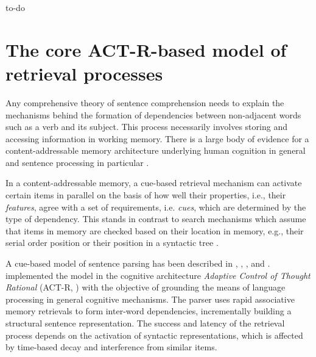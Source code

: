 \documentclass{cambridge7A}\usepackage[]{graphicx}\usepackage[]{color}
\begin{document}
to-do


\chapter{The core ACT-R-based model of retrieval processes} \label{c02}

Any comprehensive theory of sentence comprehension needs to explain the mechanisms behind the formation of dependencies between non-adjacent words such as a verb and its subject. This process necessarily involves storing and accessing information in working memory. 
There is a large body of evidence for a content-addressable memory architecture underlying human cognition in general \citep{WatkinsWatkins1975, AndersonLebiere1998,AndersonEtAl2004,Ratcliff1978} and sentence processing in particular \citep{McElree2000,McElreeForakerDyer2003, VanDykeLewis2003, LewisVasishth2005, VanDykeMcElree2011}. 

In a content-addressable memory, a cue-based retrieval mechanism can activate certain items in parallel on the basis of how well their properties, i.e., their \textit{features}, agree with a set of requirements, i.e. \textit{cues}, which are determined by the type of dependency.
This stands in contrast to search mechanisms which assume that items in memory are checked based on their location in memory, e.g., their  serial order position \citep{Sternberg1966,Sternberg1969,BerwickWeinberg1984} or their position in a syntactic tree \citep{Sturt2003}. 

A cue-based model of sentence parsing has been described in 
\cite{VanDykeLewis2003}, \cite{LewisVasishth2005}, \cite{LewisVasishthVanDyke2006}, and \cite{VasishthLewis2006}. 
\cite{LewisVasishth2005} implemented the model in the cognitive architecture  \emph{Adaptive Control of Thought Rational}  (ACT-R, \citealp{AndersonLebiere1998, AndersonEtAl2004}) with the objective of grounding the means of language processing in general cognitive mechanisms.
The parser uses rapid associative memory retrievals to form inter-word dependencies, incrementally building a structural sentence representation. The success and latency of the retrieval process depends on the activation of syntactic representations, which is affected by time-based decay and interference from similar items. 
\end{document}
